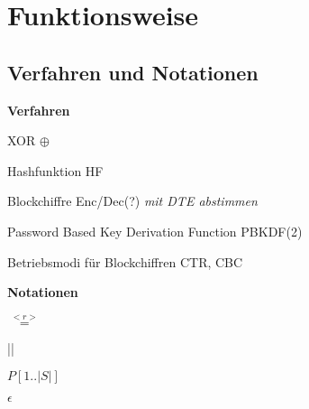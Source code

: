 \section{Funktionsweise}
\label{sec:funktionsweise}

\subsection{Verfahren und Notationen}

\textbf{Verfahren}

XOR \(\oplus\)

Hashfunktion HF

Blockchiffre Enc/Dec(?) \textit{mit DTE abstimmen}

Password Based Key Derivation Function PBKDF(2)

Betriebsmodi für Blockchiffren CTR, CBC

\textbf{Notationen}

\(\overset{<r>}{=}\)

||

\(P[1..|S|]\)

\(\epsilon\)

\newpage
